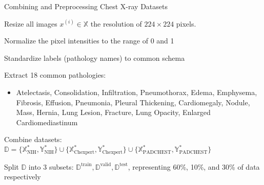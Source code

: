 \documentclass[final,1p,times,authoryear]{elsarticle}
\newenvironment{SgAlgorithm}[1][t]
{%
	\begin{algorithm2e}[#1]
    \linespread{1.5}
    \selectfont
}
{\end{algorithm2e}}
\begin{document}
\begin{SgAlgorithm}
    \caption{Combining and Preprocessing Chest X-ray Datasets}\label{alg:taxonomy.dataset}
    \BlankLine%

    \Fn{}
    {%
        {%
            Resize all images $x^{(i)} \in \mathbb{X}$ the resolution of $224 \times 224$ pixels. \;
            \BlankLine%

            Normalize the pixel intensities to the range of 0 and 1
        }
    }
    \BlankLine%

    \Fn{}
    {%
        {%
            Standardize labels (pathology names) to common schema \;
            \BlankLine%

            Extract 18 common pathologies:
            \begin{itemize}
                \item Atelectasis, Consolidation, Infiltration, Pneumothorax, Edema, Emphysema, Fibrosis, Effusion, Pneumonia, Pleural Thickening, Cardiomegaly, Nodule, Mass, Hernia, Lung Lesion, Fracture, Lung Opacity, Enlarged Cardiomediastinum
            \end{itemize}
        }
    }
    \BlankLine%

    \Fn{}
    {%
        Combine datasets: $\mathbb{D} = \{ \mathbb{X}_{\text{NIH}}^{*}, \mathbb{Y}_{\text{NIH}}^{*} \}
        \cup
        \{ \mathbb{X}_{\text{Chexpert}}^{*}, \mathbb{Y}_{\text{Chexpert}}^{*} \}
        \cup
        \{ \mathbb{X}_{\text{PADCHEST}}^{*}, \mathbb{Y}_{\text{PADCHEST}}^{*} \}$
        \BlankLine%

        Split $\mathbb{D}$ into 3 subsets: $\mathbb{D}^\text{train}, \mathbb{D}^\text{valid}, \mathbb{D}^\text{test}$, representing 60\%, 10\%, and 30\% of data respectively
    }
    \BlankLine%
\end{SgAlgorithm}
\end{document}
